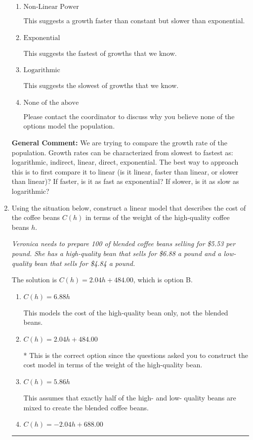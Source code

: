 \documentclass{extbook}[14pt]
\newcommand{\litem}[1]{\item #1

\rule{\textwidth}{0.4pt}}
\begin{document}
\begin{enumerate}
{\begin{enumerate}[label=\Alph*.]
This suggests a constant growth. You would be able to add or subtract the same amount year-to-year if this is the correct answer.
\item \( \text{Non-Linear Power} \)

This suggests a growth faster than constant but slower than exponential.
\item \( \text{Exponential} \)

This suggests the fastest of growths that we know.
\item \( \text{Logarithmic} \)

This suggests the slowest of growths that we know.
\item \( \text{None of the above} \)

Please contact the coordinator to discuss why you believe none of the options model the population.
\end{enumerate}

\textbf{General Comment:} We are trying to compare the growth rate of the population. Growth rates can be characterized from slowest to fastest as: logarithmic, indirect, linear, direct, exponential. The best way to approach this is to first compare it to linear (is it linear, faster than linear, or slower than linear)? If faster, is it as fast as exponential? If slower, is it as slow as logarithmic?
}
\litem{
Using the situation below, construct a linear model that describes the cost of the coffee beans $C(h)$ in terms of the weight of the high-quality coffee beans $h$.

\begin{center}
    \textit{ Veronica needs to prepare 100 of blended coffee beans selling for \$5.53 per pound. She has a high-quality bean that sells for \$6.88 a pound and a low-quality bean that sells for \$4.84 a pound. }
\end{center}
The solution is \( C(h) = 2.04 h + 484.00 \), which is option B.\begin{enumerate}[label=\Alph*.]
\item \( C(h) = 6.88 h \)

This models the cost of the high-quality bean only, not the blended beans.
\item \( C(h) = 2.04 h + 484.00 \)

* This is the correct option since the questions asked you to construct the cost model in terms of the weight of the high-quality bean.
\item \( C(h) = 5.86 h \)

This assumes that exactly half of the high- and low- quality beans are mixed to create the blended coffee beans.
\item \( C(h) = -2.04 h + 688.00 \)


\end{enumerate}}
\end{enumerate}
\end{document}
